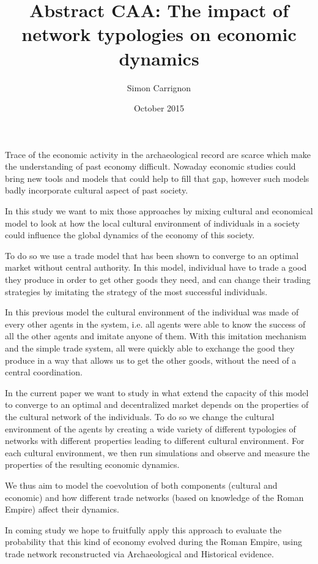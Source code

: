 \documentclass[a4paper]{article}
\title{Abstract CAA: The impact of network typologies on economic dynamics}
\author{Simon Carrignon}
\date{October 2015}
\begin{document}
Trace of the economic activity in the archaeological record are scarce which make the understanding of past economy difficult. Nowaday economic studies could bring new tools and models that could help to fill that gap, however such models badly incorporate cultural aspect of past society.

In this study we want to mix those approaches by mixing cultural and economical model to look at how the local cultural environment of individuals in a society could influence the global dynamics of the economy of this society.

To do so we use a trade model that has been shown to converge to an optimal market without central authority. In this model, individual have to trade a good they produce in order to get other goods they need, and can change their trading strategies by imitating the strategy of the most successful individuals. 

In this previous model the cultural environment of the individual was made of every other agents in the system,  i.e. all agents were able to know the success of all the other agents and imitate anyone of them. With this imitation mechanism and the simple trade system, all were quickly able to exchange the good they produce in a way that allows us to get the other goods, without the need of a central coordination. 

In the current paper we want to study in what extend the capacity of this model to converge to an optimal and decentralized market depends on the properties of the cultural network of the individuals. To do so we change the cultural environment of the agents by creating a wide variety of different typologies of networks with different properties leading to different cultural environment. For each cultural environment, we then run simulations and observe and measure the properties of the resulting economic dynamics. 

We thus aim to model the coevolution of both components (cultural and economic) and how different trade networks (based on knowledge of the Roman Empire) affect their dynamics.

In coming study we hope to fruitfully apply this approach to evaluate the probability that this kind of economy evolved during the Roman Empire, using trade network reconstructed via Archaeological and Historical evidence. 
\end{document}
